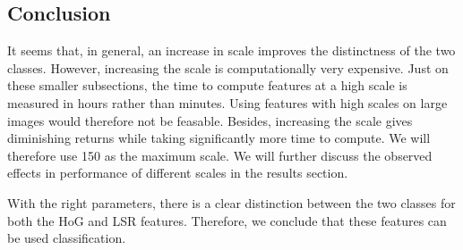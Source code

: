 \subsection{Conclusion}

It seems that, in general, an increase in scale improves the distinctness of
the two classes. However, increasing the scale is computationally very
expensive. Just on these smaller subsections, the time to compute features at
a high scale is measured in hours rather than minutes. Using features with high
scales on large images would therefore not be feasable. Besides, increasing the
scale gives diminishing returns while taking significantly more time to
compute. We will therefore use 150 as the maximum scale. We will further discuss the observed effects in performance of different scales in the results section.

With the right parameters, there is a clear distinction between the two classes
for both the HoG and LSR features. Therefore, we conclude that these features
can be used classification. 



